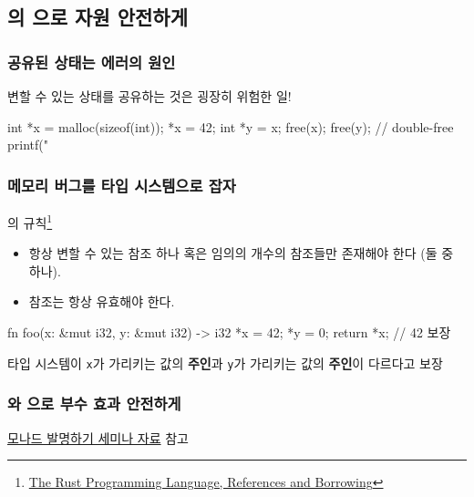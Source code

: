\documentclass{beamer}
\begin{document}
\subsection{의 으로 자원 안전하게}

\begin{frame}[c, fragile]
  \frametitle{공유된 상태는 에러의 원인}

  변할 수 있는 상태를 공유하는 것은 굉장히 위험한 일!
  \begin{ccode}
int *x = malloc(sizeof(int));
*x = 42;
int *y = x;
free(x);
free(y); // double-free
printf("%
  \end{ccode}
\end{frame}


\begin{frame}[c, fragile]
  \frametitle{메모리 버그를 타입 시스템으로 잡자}

  \begin{block}{의 규칙\footnote{\href{https://doc.rust-lang.org/book/ch04-02-references-and-borrowing.html}{The Rust Programming Language, References and Borrowing}}}
    \begin{itemize}
      \item 항상 변할 수 있는 참조 하나 혹은 임의의 개수의 참조들만 존재해야 한다 (둘 중 하나).
      \item 참조는 항상 유효해야 한다.
    \end{itemize}
  \end{block}
  \vskip-0.4cm
  \begin{rscode}
fn foo(x: &mut i32, y: &mut i32) -> i32 {
  *x = 42; *y = 0;
  return *x; // 42 보장
}
  \end{rscode}
  \vskip-0.7cm
  타입 시스템이 \texttt{x}가 가리키는 값의 \textbf{주인}과 \texttt{y}가 가리키는 값의 \textbf{주인}이 다르다고 보장
\end{frame}

\begin{frame}[c, fragile]
  \frametitle{와 으로 부수 효과 안전하게}

  \href{https://github.com/Zeta611/inventing-monads}{모나드 발명하기 세미나 자료} 참고
\end{frame}
\end{document}
